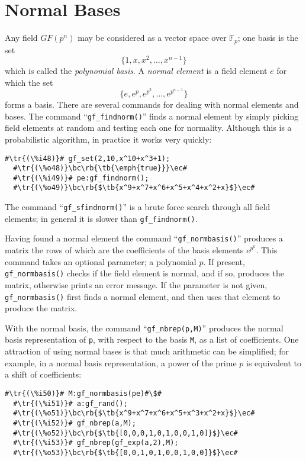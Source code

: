 \documentclass[a4paper,11pt,leqno,fleqn]{artikel3}
\newcommand{\bc}{\begin{center}}
\newcommand{\ec}{\end{center}}
\newcommand{\tr}[1]{\textcolor{red}{#1}}
\newcommand{\tb}[1]{\textcolor{blue}{#1}}
\newcommand{\rb}[1]{\raisebox{2mm}[0mm][1mm]{#1}}
\begin{document}
\section*{Normal Bases}

Any field $GF(p^n)$ may be considered as a vector space over
$\mathbb{F}_p$; one basis is the set
\[
\{1,x,x^2,\ldots,x^{n-1}\}
\]
which is called the \emph{polynomial basis}.  A \emph{normal element} is a
field element $e$ for which the set
\[
\{e,e^p,e^{p^2},\ldots,e^{p^{n-1}}\}
\]
forms a basis.  There are several commands for dealing with normal elements
and bases.  The command ``\verb!gf_findnorm()!'' finds a normal element by
simply picking field elements at random and testing each one for normality.
Although this is a probabilistic algorithm, in practice it works very quickly:

\begin{lstlisting}[escapechar=\#]
  #\tr{(\%i48)}# gf_set(2,10,x^10+x^3+1);
  #\tr{(\%o48)}\bc\rb{\tb{\emph{true}}}\ec#
  #\tr{(\%i49)}# pe:gf_findnorm();
  #\tr{(\%o49)}\bc\rb{$\tb{x^9+x^7+x^6+x^5+x^4+x^2+x}$}\ec#
\end{lstlisting}

The command ``\verb!gf_sfindnorm()!'' is a brute force search through all
field elements; in general it is slower than \verb!gf_findnorm()!.

Having found a normal element the command ``\verb!gf_normbasis()!'' produces a
matrix  the rows of which are the coefficients of the basis elements
$e^{p^k}$.  This command takes an optional parameter; a polynomial $p$.  If
present, \verb!gf_normbasis()! checks if the field element is normal, and if
so, produces the matrix, otherwise prints an error message.  If the parameter
is not given, \verb!gf_normbasis()! first finds a normal element, and then
uses that element to produce the matrix.

With the normal basis, the command ``\verb!gf_nbrep(p,M)!'' produces the
normal basis representation of \texttt{p}, with respect to the basis
\texttt{M}, as a list of coefficients.  One attraction of using normal bases
is that much arithmetic can be simplified; for example, in a normal basis
representation, a power of the prime $p$ is equivalent to a shift of
coefficients:

\begin{lstlisting}[escapechar=\#]
  #\tr{(\%i50)}# M:gf_normbasis(pe)#\$#
  #\tr{(\%i51)}# a:gf_rand();
  #\tr{(\%o51)}\bc\rb{$\tb{x^9+x^7+x^6+x^5+x^3+x^2+x}$}\ec#
  #\tr{(\%i52)}# gf_nbrep(a,M);
  #\tr{(\%o52)}\bc\rb{$\tb{[0,0,0,1,0,1,0,0,1,0]}$}\ec#
  #\tr{(\%i53)}# gf_nbrep(gf_exp(a,2),M);
  #\tr{(\%o53)}\bc\rb{$\tb{[0,0,1,0,1,0,0,1,0,0]}$}\ec#
\end{lstlisting}
\end{document}
